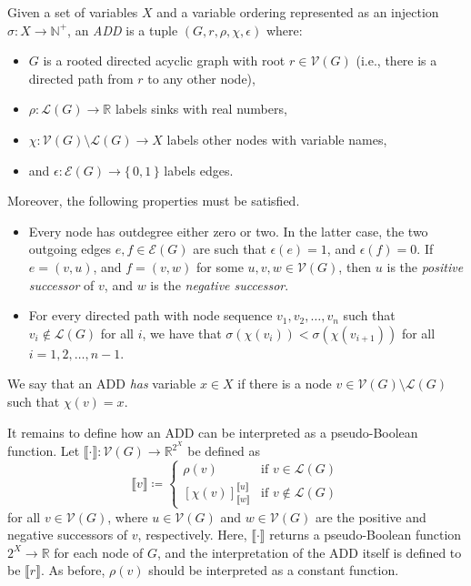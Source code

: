 \begin{definition}
  Given a set of variables $X$ and a variable ordering represented as an injection
  $\sigma\colon X \to \mathbb{N}^+$, an \emph{ADD} is a tuple $(G, r, \rho,
  \chi, \epsilon)$ where:
  \begin{itemize}
  \item $G$ is a rooted directed acyclic graph with root $r \in \mathcal{V}(G)$
    (i.e., there is a directed path from $r$ to any other node),
  \item $\rho\colon \mathcal{L}(G) \to \mathbb{R}$ labels sinks with real
    numbers,
  \item $\chi\colon \mathcal{V}(G) \setminus \mathcal{L}(G) \to X$ labels other
    nodes with variable names,
  \item and $\epsilon\colon \mathcal{E}(G) \to \{\,0, 1\,\}$ labels edges.
  \end{itemize}
  Moreover, the following properties must be satisfied.
  \begin{itemize}
  \item Every node has outdegree either zero or two. In the latter case, the two
    outgoing edges $e, f \in \mathcal{E}(G)$ are such that $\epsilon(e) = 1$,
    and $\epsilon(f) = 0$. If $e = (v, u)$, and $f = (v, w)$ for some $u, v, w
    \in \mathcal{V}(G)$, then $u$ is the \emph{positive successor} of $v$, and
    $w$ is the \emph{negative successor}.
  \item For every directed path with node sequence $v_1, v_2, \dots, v_n$ such
    that $v_i \not\in \mathcal{L}(G)$ for all $i$, we have that
    $\sigma(\chi(v_i)) < \sigma(\chi(v_{i+1}))$ for all $i = 1, 2, \dots, n -
    1$.
  \end{itemize}
  We say that an ADD \emph{has} variable $x \in X$ if there is a node $v \in
  \mathcal{V}(G) \setminus \mathcal{L}(G)$ such that $\chi(v) = x$.

  It remains to define how an ADD can be interpreted as a pseudo-Boolean
  function. Let $\llbracket \cdot \rrbracket\colon \mathcal{V}(G) \to
  \mathbb{R}^{2^X}$ be defined as
  \[
    \llbracket v \rrbracket \coloneqq
    \begin{cases}
      \rho(v) & \text{if } v \in \mathcal{L}(G) \\
      [\chi(v)]^{\llbracket u \rrbracket}_{\llbracket w \rrbracket} &
      \text{if } v \not\in \mathcal{L}(G)
    \end{cases}
  \]
  for all $v \in \mathcal{V}(G)$, where $u \in \mathcal{V}(G)$ and $w \in
  \mathcal{V}(G)$ are the positive and negative successors of $v$, respectively.
  Here, $\llbracket \cdot \rrbracket$ returns a pseudo-Boolean function $2^X \to
  \mathbb{R}$ for each node of $G$, and the interpretation of the ADD itself is
  defined to be $\llbracket r \rrbracket$. As before, $\rho(v)$ should be
  interpreted as a constant function.
\end{definition}

